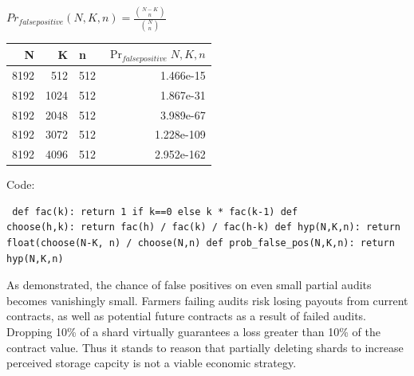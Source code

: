 \documentclass[a4paper,10pt]{article} \usepackage[utf8]{inputenc}
\begin{document}
{\centering $Pr_{false positive}(N,K,n) = \displaystyle \frac{{N-K \choose n}}
{{N \choose n}}$ \\}

\begin{table}[hbt!] \begin{center} \begin{tabular}{r r l r} N & K & n &
$\Pr_{falsepositive}{N,K,n}$\\ \hline 8192 & 512  & 512 & 1.466e-15\\ \hline
8192 & 1024 & 512 & 1.867e-31\\ \hline 8192 & 2048 & 512 & 3.989e-67\\ \hline
8192 & 3072 & 512 & 1.228e-109\\ \hline 8192 & 4096 & 512 & 2.952e-162\\
\end{tabular} \end{center} \end{table}

Code: \begin{lstlisting} def fac(k): return 1 if k==0 else k * fac(k-1) def
choose(h,k): return fac(h) / fac(k) / fac(h-k) def hyp(N,K,n): return
float(choose(N-K, n) / choose(N,n) def prob_false_pos(N,K,n): return hyp(N,K,n)
\end{lstlisting}

As demonstrated, the chance of false positives on even small partial audits
becomes vanishingly small. Farmers failing audits risk losing payouts from
current contracts, as well as potential future contracts as a result of failed
audits. Dropping 10\% of a shard virtually guarantees a loss greater than 10\%
of the contract value. Thus it stands to reason that partially deleting shards
to increase perceived storage capcity is not a viable economic strategy.

\newpage  \begingroup \raggedright
 \endgroup
\end{document}
